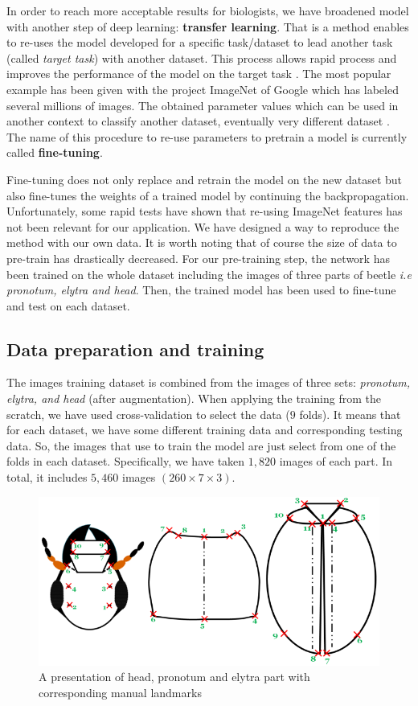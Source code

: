 \documentclass[review]{elsarticle}
\begin{document}
In order to reach more acceptable results for biologists, we have broadened model with another step of deep learning: \textbf{transfer learning}. That is a method enables to re-uses the model developed for a specific task/dataset to lead another task (called \textit{target task}) with another dataset. This process allows rapid process and improves the performance of the model on the target task \cite{torrey2009transfer}. The most popular example has been given with the project ImageNet of Google \cite{imagenet_cvpr09} which has labeled several millions of images. The obtained parameter values which can be used in another context to classify another dataset, eventually very different dataset \cite{margeta_mri}. The name of this procedure to re-use parameters to pretrain a model is currently called \textbf{fine-tuning}.

Fine-tuning does not only replace and retrain the model on
the new dataset but also fine-tunes the weights of a trained
model by continuing the backpropagation. Unfortunately,
some rapid tests have shown that re-using ImageNet features
has not been relevant for our application. We have designed a
way to reproduce the method with our own data. It is worth
noting that of course the size of data to pre-train has drastically decreased. For our pre-training step, the network has been
trained on the whole dataset including the images of three parts
of beetle \textit{i.e pronotum, elytra and head}. Then, the trained model
has been used to fine-tune and test on each dataset.
\subsection{Data preparation and training}
The images training dataset is combined from the images of three sets: \textit{pronotum, elytra, and head} (after augmentation). When applying the training from the scratch, we have used cross-validation to select the data ($9$ folds). It means that for each dataset, we have some different training data and corresponding testing data. So, the images that use to train the model are just select from one of the folds in each dataset. Specifically, we have taken $1, 820$ images of each part. In total, it includes $5, 460$ images $(260 \times 7 \times 3)$. 

\begin{figure}[htbp]
	\centerline{\includegraphics[scale=0.5]{images/merge}}
	\caption{A presentation of head, pronotum and elytra part with
corresponding manual landmarks}
	\label{figmerge}
\end{figure}
\end{document}

